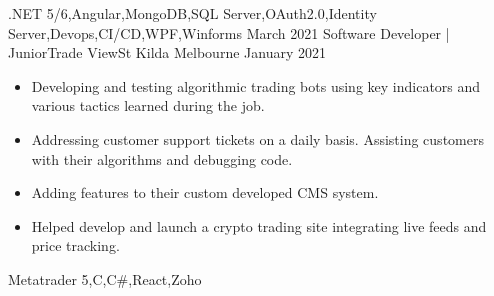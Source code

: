 \begin{experiences}
                    {.NET 5/6,Angular,MongoDB,SQL Server,OAuth2.0,Identity Server,Devops,CI/CD,WPF,Winforms}
  \emptySeparator
  \experience
    {March 2021}     {Software Developer | Junior}{Trade View}{St Kilda Melbourne}
    {January 2021}    {
                      \begin{itemize}
                        \item Developing and testing algorithmic trading bots using key indicators and various tactics learned during the job.
                        \item Addressing customer support tickets on a daily basis. Assisting customers with their algorithms and debugging code.
                        \item Adding features to their custom developed CMS system.
                        \item Helped develop and launch a crypto trading site integrating live feeds and price tracking. 
                      \end{itemize}
                    }
                    {Metatrader 5,C,C\#,React,Zoho}
  \emptySeparator
\end{experiences}
